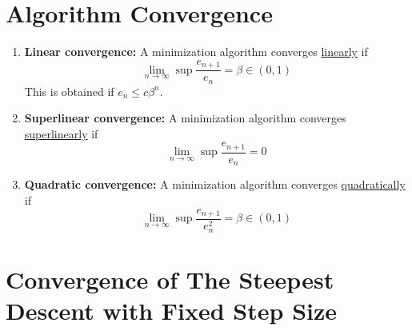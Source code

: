 \documentclass[11pt]{elegantbook}
\begin{document}
\section{Algorithm Convergence}
\begin{enumerate}[(1)]
    \item \textbf{Linear convergence:} A minimization algorithm converges \underline{linearly} if $$\lim_{n \rightarrow \infty}\sup\frac{e_{n+1}}{e_n}=\beta\in (0,1)$$ This is obtained if $e_n\leq c\beta^n$.
    \item \textbf{Superlinear convergence:} A minimization algorithm converges \underline{superlinearly} if $$\lim_{n \rightarrow \infty}\sup\frac{e_{n+1}}{e_n}=0$$
    \item \textbf{Quadratic convergence:} A minimization algorithm converges \underline{quadratically} if $$\lim_{n \rightarrow \infty}\sup\frac{e_{n+1}}{e_n^2}=\beta\in (0,1)$$
\end{enumerate}

\section{Convergence of The Steepest Descent with Fixed Step Size}
\end{document}
